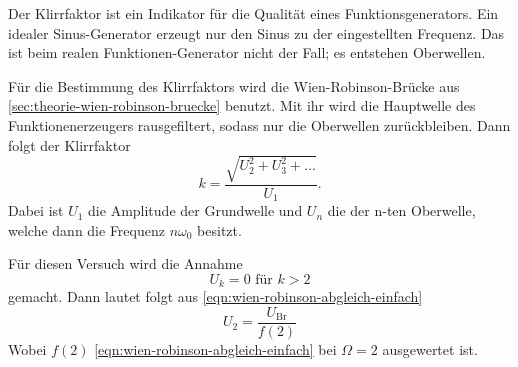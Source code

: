 Der Klirrfaktor ist ein Indikator für die Qualität eines Funktionsgenerators. Ein idealer 
Sinus-Generator erzeugt nur den Sinus zu der eingestellten Frequenz. Das ist beim realen 
Funktionen-Generator nicht der Fall; es entstehen Oberwellen.

Für die Bestimmung des Klirrfaktors wird die Wien-Robinson-Brücke aus 
\autoref{sec:theorie-wien-robinson-bruecke} benutzt. Mit ihr wird die Hauptwelle des 
Funktionenerzeugers rausgefiltert, sodass nur die Oberwellen zurückbleiben. Dann folgt der
Klirrfaktor
\begin{equation}
	k = \frac{\sqrt{U_2^2 + U_3^2 + \hdots}}{U_1}.
	\label{eqn:klirrfaktor}
\end{equation}
Dabei ist $U_1$ die Amplitude der Grundwelle und $U_n$ die der n-ten Oberwelle, welche dann die
Frequenz $n\omega_0$ besitzt.

Für diesen Versuch wird die Annahme 
\begin{equation}
	U_k = 0 \text{ für } k > 2
	\label{eqn:klirrfaktor-annahme}
\end{equation}
gemacht. Dann lautet folgt aus \autoref{eqn:wien-robinson-abgleich-einfach}
\begin{equation}
	U_2 = \frac{U_\text{Br}}{f(2)}
	\label{eqn:klirrfaktor-u2}
\end{equation}
Wobei $f(2)$ \autoref{eqn:wien-robinson-abgleich-einfach} bei $\Omega = 2$ ausgewertet ist.

